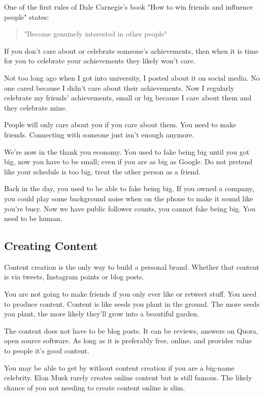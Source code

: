 \documentclass{article}
\begin{document}
One of the first rules of Dale Carnegie's book "How to win friends and
influence people" states:

\begin{quote}"Become genuinely interested in other people"\end{quote}

If you don't care about or celebrate someone's achievements, then when
it is time for you to celebrate your achievements they likely won't
care.

Not too long ago when I got into university, I posted about it on social
media. No one cared because I didn't care about their achievements. Now
I regularly celebrate my friends' achievements, small or big because I
care about them and they celebrate mine.

People will only care about you if you care about them. You need to make
friends. Connecting with someone just isn't enough anymore.

We're now in the thank you economy. You used to fake being big until you
got big, now you have to be small; even if you are as big as Google. Do
not pretend like your schedule is too big, treat the other person as a
friend.

Back in the day, you used to be able to fake being big. If you owned a
company, you could play some background noise when on the phone to make
it sound like you're busy. Now we have public follower counts, you
cannot fake being big. You need to be human.

\subsection{Creating Content}
Content creation is the only way to build a personal brand. Whether that
content is via tweets, Instagram points or blog posts.

You are not going to make friends if you only ever like or retweet
stuff. You need to produce content. Content is like seeds you plant in
the ground. The more seeds you plant, the more likely they'll grow into
a beautiful garden.

The content does not have to be blog posts. It can be reviews, answers
on Quora, open source software. As long as it is preferably free,
online, and provides value to people it's good content.

You may be able to get by without content creation if you are a big-name
celebrity. Elon Musk rarely creates online content but is still famous.
The likely chance of you not needing to create content online is slim.
\end{document}
